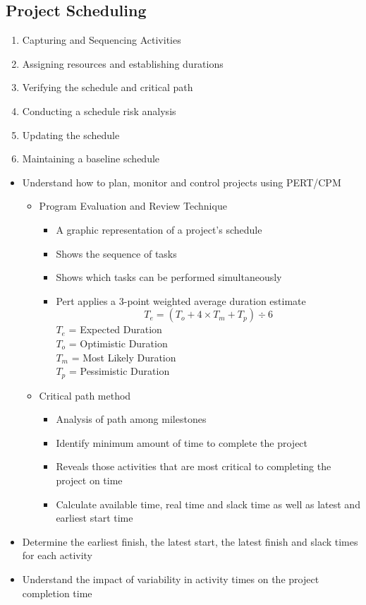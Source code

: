 \documentclass{article}[18pt]
\begin{document}
\subsection{Project Scheduling}
\begin{enumerate}
	\item Capturing and Sequencing Activities
	\item Assigning resources and establishing durations
	\item Verifying the schedule and critical path
	\item Conducting a schedule risk analysis
	\item Updating the schedule
	\item Maintaining a baseline schedule
\end{enumerate}
\begin{itemize}
	\item Understand how to plan, monitor and control projects using PERT/CPM
	\begin{itemize}
		\item Program Evaluation and Review Technique
		\begin{itemize}
			\item A graphic representation of a project's schedule
			\item Shows the sequence of tasks
			\item Shows which tasks can be performed simultaneously
			\item Pert applies a 3-point weighted average duration estimate
$$T_e=(T_o+4\times T_m + T_p)\div 6$$
$T_e$ = Expected Duration\\
$T_o$ = Optimistic Duration\\
$T_m$ = Most Likely Duration\\
$T_p$ = Pessimistic Duration
		\end{itemize}
	
		\item Critical path method
		\begin{itemize}
			\item Analysis of path among milestones
			\item Identify minimum amount of time to complete the project
			\item Reveals those activities that are most critical to completing the project on time
			\item Calculate available time, real time and slack time as well as latest and earliest start time
		\end{itemize}
	\end{itemize}
	\item Determine the earliest finish, the latest start, the latest finish and slack times for each activity
	\item Understand the impact of variability in activity times on the project completion time
\end{itemize}
\end{document}
